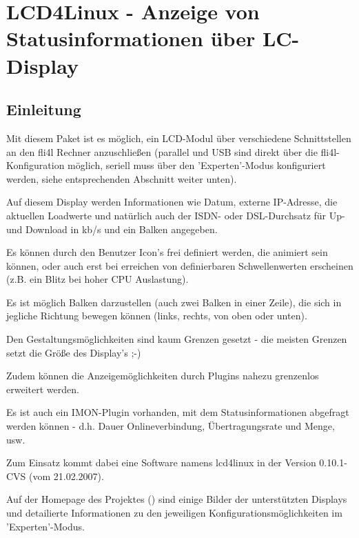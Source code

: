 {
  \section {LCD4Linux - Anzeige von Statusinformationen über LC-Display}
}

\subsection{Einleitung}

    Mit diesem Paket ist es möglich, ein LCD-Modul über verschiedene 
    Schnittstellen an den fli4l Rechner anzuschließen 
    (parallel und USB sind direkt über die fli4l-Konfiguration möglich, 
    seriell muss über den 'Experten'-Modus konfiguriert werden, siehe 
    entsprechenden Abschnitt weiter unten).

    Auf diesem Display werden Informationen wie Datum, externe IP-Adresse, 
    die aktuellen Loadwerte und natürlich auch der ISDN- oder DSL-Durchsatz 
    für Up- und Download in kb/s und ein Balken angegeben.

    Es können durch den Benutzer Icon's frei definiert werden, die animiert sein 
    können, oder auch erst bei erreichen von definierbaren Schwellenwerten 
    erscheinen (z.B. ein Blitz bei hoher CPU Auslastung).

    Es ist möglich Balken darzustellen (auch zwei Balken in einer Zeile), die 
    sich in jegliche Richtung bewegen können (links, rechts, von oben oder unten).

    Den Gestaltungsmöglichkeiten sind kaum Grenzen gesetzt - die meisten Grenzen 
    setzt die Größe des Display's ;-)

    Zudem können die Anzeigemöglichkeiten durch Plugins nahezu grenzenlos 
    erweitert werden.

    Es ist auch ein IMON-Plugin vorhanden, mit dem Statusinformationen abgefragt 
    werden können - d.h. Dauer Onlineverbindung, Übertragungsrate und Menge, usw.

    Zum Einsatz kommt dabei eine Software namens lcd4linux in der 
    Version 0.10.1-CVS (vom 21.02.2007).

    Auf der Homepage des Projektes
    	()
    sind einige Bilder der unterstützten Displays und detailierte Informationen
    zu den jeweiligen Konfigurationsmöglichkeiten im 'Experten'-Modus.


